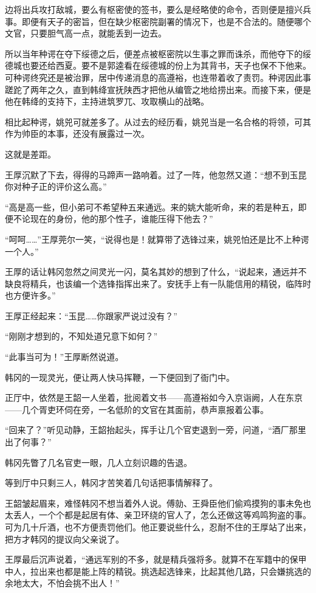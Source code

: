 边将出兵攻打敌城，要么有枢密使的签书，要么是经略使的命令，否则便是擅兴兵事。即便有天子的密旨，但在缺少枢密院副署的情况下，也是不合法的。随便哪个文官，只要胆气高一点，就能丢到一边去。

所以当年种谔在夺下绥德之后，便差点被枢密院以生事之罪而诛杀，而他夺下的绥德城也要还给西夏。要不是郭逵看在绥德城的份上为其背书，天子也保不下他来。可种谔终究还是被治罪，居中传递消息的高遵裕，也连带着收了责罚。种谔因此事蹉跎了两年之久，直到韩绛宣抚陕西才把他从编管之地给捞出来。而接下来，便是他在韩绛的支持下，主持进筑罗兀、攻取横山的战略。

相比起种谔，姚兕可就差多了。从过去的经历看，姚兕当是一名合格的将领，可其作为帅臣的本事，还没有展露过一次。

这就是差距。

王厚沉默了下去，得得的马蹄声一路响着。过了一阵，他忽然又道：“想不到玉昆你对种子正的评价这么高。”

“高是高一些，但小弟可不希望种五来通远。来的姚大能听命，来的若是种五，即便不论现在的身份，他的那个性子，谁能压得下他去？”

“呵呵……”王厚莞尔一笑，“说得也是！就算带了选锋过来，姚兕怕还是比不上种谔一个人。”

王厚的话让韩冈忽然之间灵光一闪，莫名其妙的想到了什么，“说起来，通远并不缺良将精兵，也该编一个选锋指挥出来了。安抚手上有一队能信用的精锐，临阵时也方便许多。”

王厚正经起来：“玉昆……你跟家严说过没有？”

“刚刚才想到的，不知处道兄意下如何？”

“此事当可为！”王厚断然说道。

韩冈的一现灵光，便让两人快马挥鞭，一下便回到了衙门中。

正厅中，依然是王韶一人坐着，批阅着文书——高遵裕如今入京诣阙，人在东京——几个胥吏环伺在旁，一名低阶的文官在其面前，恭声禀报着公事。

“回来了？”听见动静，王韶抬起头，挥手让几个官吏退到一旁，问道，“酒厂那里出了何事？”

韩冈先瞥了几名官吏一眼，几人立刻识趣的告退。

等到厅中只剩三人，韩冈才苦笑着几句话把事情解释了。

王韶皱起眉来，难怪韩冈不想当着外人说。傅勍、王舜臣他们偷鸡摸狗的事未免也太丢人，一个个都是起居有体、亲卫环绕的官人了，怎么还做这等鸡鸣狗盗的事。可为几十斤酒，也不方便责罚他们。他正要说些什么，忍耐不住的王厚站了出来，把方才韩冈的提议向父亲说了。

王厚最后沉声说着，“通远军别的不多，就是精兵强将多。就算不在军籍中的保甲中人，拉出来也都是能上阵的精锐。挑选起选锋来，比起其他几路，只会嫌挑选的余地太大，不怕会挑不出人！”

